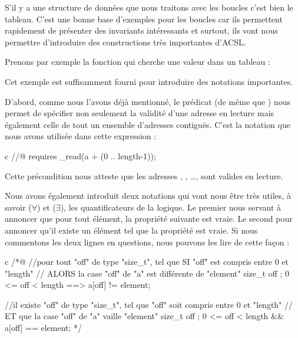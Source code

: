 

S'il y a une structure de données que nous traitons avec les boucles c'est bien
le tableau. C'est une bonne base d'exemples pour les boucles car ils permettent
rapidement de présenter des invariants intéressants et surtout, ils vont nous 
permettre d'introduire des constructions très importantes d'ACSL.



Prenons par exemple la fonction qui cherche une valeur dans un tableau :






Cet exemple est suffisamment fourni pour introduire des notations importantes.



D'abord, comme nous l'avons déjà mentionné, le prédicat  (de 
même que ) nous permet de spécifier non seulement la validité d'une 
adresse en lecture mais également celle de tout un ensemble d'adresses 
contiguës. C'est la notation que nous avons utilisée dans cette expression :



\begin{CodeBlock}{c}
//@ requires \valid_read(a + (0 .. length-1));
\end{CodeBlock}



Cette précondition nous atteste que les adresses , 
, \ldots{},  sont valides en lecture.



Nous avons également introduit deux notations qui vont nous être très utiles, à 
savoir  ($\forall$) et  ($\exists$), les 
quantificateurs de la logique. Le premier nous servant à annoncer que pour tout
élément, la propriété suivante est vraie. Le second pour annoncer qu'il existe
un élément tel que la propriété est vraie. Si nous commentons les deux lignes en 
questions, nous pouvons les lire de cette façon :



\begin{CodeBlock}{c}
/*@
//pour tout "off" de type "size_t", tel que SI "off" est compris entre 0 et "length"
//                                 ALORS la case "off" de "a" est différente de "element"
\forall size_t off ; 0 <= off < length ==> a[off] != element;

//il existe "off" de type "size_t", tel que "off" soit compris entre 0 et "length"
//                                 ET que la case "off" de "a" vaille "element"
\exists size_t off ; 0 <= off < length && a[off] == element;
*/
\end{CodeBlock}



